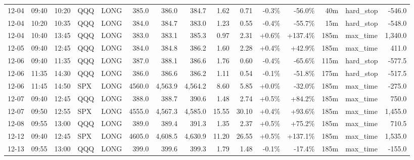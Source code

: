 \documentclass[11pt,a4paper,twoside]{article}
\begin{document}
\begin{landscape}
\begin{center}
\begin{longtable}{>{\color{txtmain}}l l l l l r r r r r r r r >{\color{txtmain}}l r}
12-04 & 09:40 & 10:20 & QQQ & LONG & 385.0 & 386.0 & 384.7 & 1.62 & 0.71 & \textcolor{lossred}{-0.3\%} & \textcolor{lossred}{-56.0\%} & 40m & hard\_stop & \textcolor{lossred}{-546.0} \\
12-04 & 10:20 & 10:35 & QQQ & LONG & 384.0 & 384.7 & 383.0 & 1.23 & 0.55 & \textcolor{lossred}{-0.4\%} & \textcolor{lossred}{-55.7\%} & 15m & hard\_stop & \textcolor{lossred}{-548.0} \\
12-04 & 10:40 & 13:45 & QQQ & LONG & 383.0 & 383.1 & 385.3 & 0.97 & 2.31 & \textcolor{wingreen}{+0.6\%} & \textcolor{wingreen}{+137.4\%} & 185m & max\_time & \textcolor{wingreen}{1,340.0} \\
12-05 & 09:40 & 12:45 & QQQ & LONG & 384.0 & 384.8 & 386.2 & 1.60 & 2.28 & \textcolor{wingreen}{+0.4\%} & \textcolor{wingreen}{+42.9\%} & 185m & max\_time & \textcolor{wingreen}{411.0} \\
12-06 & 09:40 & 11:35 & QQQ & LONG & 387.0 & 388.1 & 386.6 & 1.76 & 0.60 & \textcolor{lossred}{-0.4\%} & \textcolor{lossred}{-65.6\%} & 115m & hard\_stop & \textcolor{lossred}{-577.5} \\
12-06 & 11:35 & 14:30 & QQQ & LONG & 386.0 & 386.6 & 386.2 & 1.11 & 0.54 & \textcolor{lossred}{-0.1\%} & \textcolor{lossred}{-51.8\%} & 175m & hard\_stop & \textcolor{lossred}{-517.5} \\
12-06 & 11:45 & 14:50 & SPX & LONG & 4560.0 & 4,563.9 & 4,564.2 & 8.60 & 5.85 & \textcolor{wingreen}{+0.0\%} & \textcolor{lossred}{-32.0\%} & 185m & max\_time & \textcolor{lossred}{-275.0} \\
12-07 & 09:40 & 12:45 & QQQ & LONG & 388.0 & 388.7 & 390.6 & 1.48 & 2.74 & \textcolor{wingreen}{+0.5\%} & \textcolor{wingreen}{+84.2\%} & 185m & max\_time & \textcolor{wingreen}{750.0} \\
12-07 & 09:50 & 12:55 & SPX & LONG & 4555.0 & 4,567.3 & 4,585.0 & 15.55 & 30.10 & \textcolor{wingreen}{+0.4\%} & \textcolor{wingreen}{+93.6\%} & 185m & max\_time & \textcolor{wingreen}{1,455.0} \\
12-08 & 09:55 & 13:00 & QQQ & LONG & 389.0 & 389.4 & 391.3 & 1.35 & 2.37 & \textcolor{wingreen}{+0.5\%} & \textcolor{wingreen}{+75.2\%} & 185m & max\_time & \textcolor{wingreen}{710.5} \\
12-12 & 09:40 & 12:45 & SPX & LONG & 4605.0 & 4,608.5 & 4,630.9 & 11.20 & 26.55 & \textcolor{wingreen}{+0.5\%} & \textcolor{wingreen}{+137.1\%} & 185m & max\_time & \textcolor{wingreen}{1,535.0} \\
12-13 & 09:55 & 13:00 & QQQ & LONG & 399.0 & 399.6 & 399.3 & 1.79 & 1.48 & \textcolor{lossred}{-0.1\%} & \textcolor{lossred}{-17.4\%} & 185m & max\_time & \textcolor{lossred}{-155.0} \\

\end{longtable}
\end{center}
\end{landscape}
\end{document}
